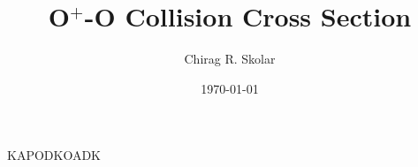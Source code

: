 \documentclass{report}
\title{O$^+$-O Collision Cross Section}
\author{Chirag R. Skolar}
\date{\today}
\begin{document}
	\maketitle
	
	\tableofcontents
	
	
	
	
	
	
	
	
	KAPODKOADK \cite{goodwin2018_dissertation}
	
	
	
	
	
	
	
	\begin{appendices}
		
	\end{appendices}
	
\end{document}
